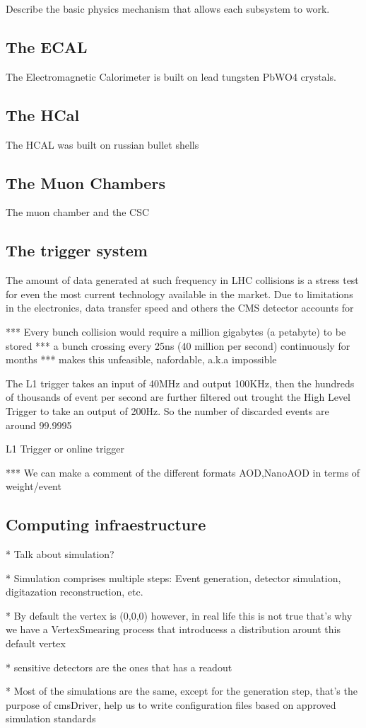 Describe the basic physics mechanism that allows each subsystem to work.


\subsection{The ECAL}

The Electromagnetic Calorimeter is built on lead tungsten PbWO4 crystals.

\subsection{The HCal}

The HCAL was built on russian bullet shells


\subsection{The Muon Chambers}

The muon chamber and the CSC

\subsection{The trigger system}

The amount of data generated at such frequency in LHC collisions is a stress
test for even the most current technology available in the market. Due to
limitations in the electronics, data transfer speed and others the CMS detector
accounts for


*** Every bunch collision would require a million gigabytes (a petabyte) to be stored
*** a bunch crossing every 25ns (40 million per second) continuously for months
*** makes this unfeasible, nafordable, a.k.a impossible

The L1 trigger takes an input of 40MHz and output 100KHz, then the hundreds of
thousands of event per second are further filtered out trought the High Level
Trigger to take an output of 200Hz. So the number of discarded events are
around 99.9995%

L1 Trigger or online trigger

*** We can make a comment of the different formats AOD,NanoAOD in terms of weight/event


\subsection{Computing infraestructure}

* Talk about simulation?

* Simulation comprises multiple steps: Event generation, detector simulation, digitazation
reconstruction, etc.

* By default the vertex is (0,0,0) however, in real life this is not true that's why
we have a VertexSmearing process that introducess a distribution arount this default vertex

* sensitive detectors are the ones that has a readout

* Most of the simulations are the same, except for the generation step, that's the purpose
of cmsDriver, help us to write configuration files based on approved simulation standards

